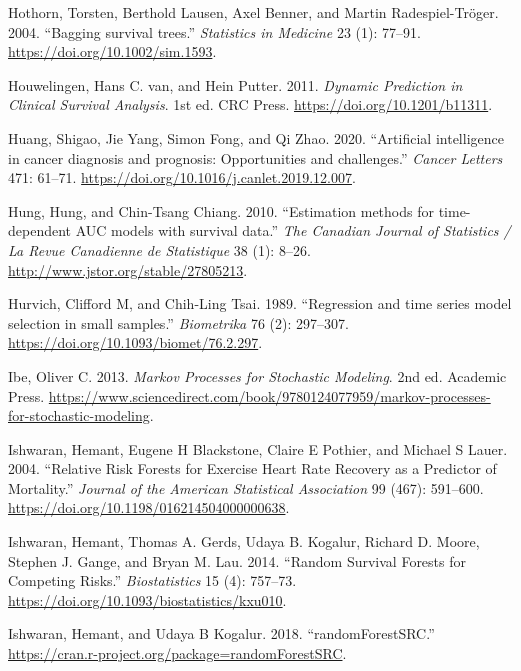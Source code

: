 \documentclass[
  letterpaper,
  krantz2]{style/krantz}
\newlength{\cslhangindent}
\newenvironment{CSLReferences}[2] %
 {\begin{list}{}{%
  \setlength{\itemindent}{0pt}
  \setlength{\leftmargin}{0pt}
  \setlength{\parsep}{0pt}
  \ifodd #1
   \setlength{\leftmargin}{\cslhangindent}
   \setlength{\itemindent}{-1\cslhangindent}
  \fi
  \setlength{\itemsep}{#2\baselineskip}}}
 {\end{list}}
\begin{document}
\begin{CSLReferences}{1}{0}
Hothorn, Torsten, Berthold Lausen, Axel Benner, and Martin
Radespiel-Tröger. 2004. {``{Bagging survival trees}.''} \emph{Statistics
in Medicine} 23 (1): 77--91. \url{https://doi.org/10.1002/sim.1593}.

Houwelingen, Hans C. van, and Hein Putter. 2011. \emph{Dynamic
Prediction in Clinical Survival Analysis}. 1st ed. CRC Press.
\url{https://doi.org/10.1201/b11311}.

Huang, Shigao, Jie Yang, Simon Fong, and Qi Zhao. 2020. {``{Artificial
intelligence in cancer diagnosis and prognosis: Opportunities and
challenges}.''} \emph{Cancer Letters} 471: 61--71.
\url{https://doi.org/10.1016/j.canlet.2019.12.007}.

Hung, Hung, and Chin-Tsang Chiang. 2010. {``{Estimation methods for
time-dependent AUC models with survival data}.''} \emph{The Canadian
Journal of Statistics / La Revue Canadienne de Statistique} 38 (1):
8--26. \url{http://www.jstor.org/stable/27805213}.

Hurvich, Clifford M, and Chih-Ling Tsai. 1989. {``{Regression and time
series model selection in small samples}.''} \emph{Biometrika} 76 (2):
297--307. \url{https://doi.org/10.1093/biomet/76.2.297}.

Ibe, Oliver C. 2013. \emph{Markov Processes for Stochastic Modeling}.
2nd ed. Academic Press.
\url{https://www.sciencedirect.com/book/9780124077959/markov-processes-for-stochastic-modeling}.

Ishwaran, Hemant, Eugene H Blackstone, Claire E Pothier, and Michael S
Lauer. 2004. {``{Relative Risk Forests for Exercise Heart Rate Recovery
as a Predictor of Mortality}.''} \emph{Journal of the American
Statistical Association} 99 (467): 591--600.
\url{https://doi.org/10.1198/016214504000000638}.

Ishwaran, Hemant, Thomas A. Gerds, Udaya B. Kogalur, Richard D. Moore,
Stephen J. Gange, and Bryan M. Lau. 2014. {``Random Survival Forests for
Competing Risks.''} \emph{Biostatistics} 15 (4): 757--73.
\url{https://doi.org/10.1093/biostatistics/kxu010}.

Ishwaran, Hemant, and Udaya B Kogalur. 2018. {``{randomForestSRC}.''}
\url{https://cran.r-project.org/package=randomForestSRC}.


\end{CSLReferences}
\end{document}
